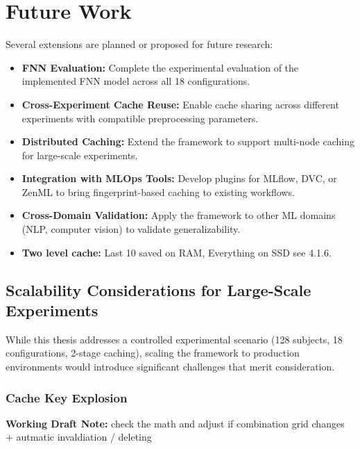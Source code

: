 \documentclass{imc-inf} %
\begin{document}
\section{Future Work}

Several extensions are planned or proposed for future research:

\begin{itemize}
\item \textbf{FNN Evaluation:} Complete the experimental evaluation of the implemented FNN model across all 18 configurations.
\item \textbf{Cross-Experiment Cache Reuse:} Enable cache sharing across different experiments with compatible preprocessing parameters.
\item \textbf{Distributed Caching:} Extend the framework to support multi-node caching for large-scale experiments.
\item \textbf{Integration with MLOps Tools:} Develop plugins for MLflow, DVC, or ZenML to bring fingerprint-based caching to existing workflows.
\item \textbf{Cross-Domain Validation:} Apply the framework to other ML domains (NLP, computer vision) to validate generalizability.
\item \textbf{Two level cache:} Last 10 saved on RAM, Everything on SSD see 4.1.6.
\end{itemize}
\subsection{Scalability Considerations for Large-Scale Experiments}

While this thesis addresses a controlled experimental scenario (128 subjects, 18 configurations, 2-stage caching), scaling the framework to production environments would introduce significant challenges that merit consideration.

\subsubsection{Cache Key Explosion}



\begin{center}
\colorbox{yellow!20}{%
\begin{minipage}{0.9\textwidth}
\textbf{Working Draft Note:} 
check the math and adjust if combination grid changes + autmatic invaldiation / deleting 
\end{minipage}
}
\end{center}
\end{document}

